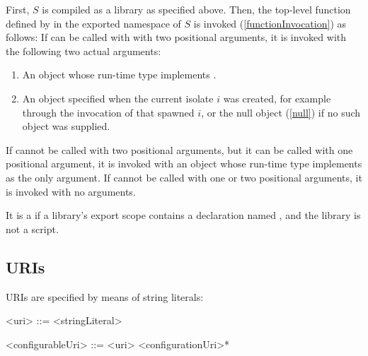 \documentclass[makeidx]{article}
\begin{document}
{\LMHash{}%
First, $S$ is compiled as a library as specified above.
Then, the top-level function defined by 
in the exported namespace of $S$ is invoked (\ref{functionInvocation})
as follows:
If  can be called with with two positional arguments,
it is invoked with the following two actual arguments:
\begin{enumerate}
\item An object whose run-time type implements .
\item An object specified when the current isolate $i$ was created,
for example through the invocation of  that spawned $i$,
or the null object (\ref{null}) if no such object was supplied.
\end{enumerate}
If  cannot be called with two positional arguments,
but it can be called with one positional argument,
it is invoked with an object whose run-time type implements 
as the only argument.
If  cannot be called with one or two positional arguments,
it is invoked with no arguments.



\LMHash{}%
It is a
 if a library's export scope contains a declaration
named , and the library is not a script.


\subsection{URIs}

\LMHash{}%
URIs are specified by means of string literals:

\begin{grammar}
<uri> ::= <stringLiteral>

<configurableUri> ::= <uri> <configurationUri>*


\end{grammar}}
\end{document}

